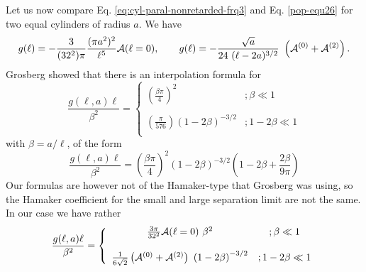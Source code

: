 \documentclass[onecolumn,letterpaper,amsmath,amssymb,floatfix,aps,superscriptaddress]{revtex4}
\begin{document}
Let us now compare Eq. \ref{eq:cyl-paral-nonretarded-frq3} and Eq. \ref{pop-equ26} for two equal cylinders of radius $a$. We have 
\begin{equation}
g(\ell) = - \frac{3}{(32^2) \pi } \frac{(\pi a^2)^{2}}{\ell^5} {\cal A}(\ell = 0), \qquad g(\ell)=-\frac{\sqrt{a}}{24~(\ell - 2a)^{3/2}}~\left({\cal A}^{(0)}+{\cal A}^{(2)}\right).
\end{equation}
Grosberg \cite{Grosb} showed that there is an interpolation formula for
\begin{equation}
\frac{g(\ell,a) \ell}{\beta^2} = \left\{ 
\begin{array}{cc}
\left( \frac{\beta \pi}{4}\right)^2 &; \beta \ll 1\\ ~ & ~ \\
\left( \frac{\pi}{576}\right) \left( 1 - 2 \beta\right)^{-3/2} &;  1 - 2 \beta \ll 1 \\
\end{array}
\right.
\end{equation}
with $\beta = a/\ell$, of the form
\begin{equation}
\frac{g(\ell,a) \ell}{\beta^2} = \left( \frac{\beta \pi}{4}\right)^2 \left( 1 - 2 \beta\right)^{-3/2} \left( 1 - 2 \beta + \frac{2 \beta}{9 \pi} \right)
\end{equation}
Our formulas are however not of the Hamaker-type that Grosberg was using, so the Hamaker coefficient for the small and large separation limit are not the same. In our case we have rather
\begin{equation}
\frac{g(\ell,a) \ell}{\beta^2} = \left\{ 
\begin{array}{cc}
\frac{3 \pi}{32^2} {\cal A}(\ell = 0) ~\beta^2 &; \beta \ll 1\\ ~ & ~ \\
\frac{1}{6 \sqrt2} \left({\cal A}^{(0)}+{\cal A}^{(2)}\right) ~\left( 1 - 2 \beta\right)^{-3/2} &;  1 - 2 \beta \ll 1 \\
\end{array}
\right.
\end{equation}
\end{document}

